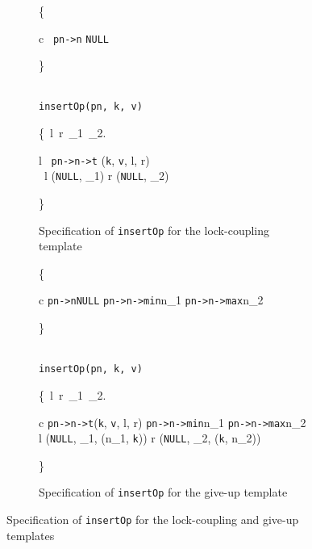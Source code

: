 \documentclass[sigplan,screen]{acmart}
\begin{document}
\begin{figure*}[h]
	\begin{subfigure}{\textwidth}
		\centering
		\begin{mathpar}
			{\color{specblue}
				\left\{ 
				\begin{array}{c}
					\ \texttt{pn->n} \mapsto \texttt{NULL}  
				\end{array}
				\right\}
			} \vspace{-0.85em} 
			\\ 
			\texttt{insertOp(pn, k, v)} 
			\vspace{-0.85em} 
			\\
			{\color{specblue}
				\left\{\exists \  l\ r\ \mathit{lk}_1\ _2.
				\begin{array}{l}
					\ \texttt{pn->n->t} \mapsto (\texttt{k}, \texttt{v}, l, r) \ \ast \ \\ 
					\ l \mapsto (\texttt{NULL}, _1)  \ast  r \mapsto (\texttt{NULL}, \mathit{lk}_2)
				\end{array}
				\right\}
			}
		\end{mathpar}
		\caption{Specification of \texttt{insertOp} for the lock-coupling template}
		\label{fig:insertOp_lock}
	\end{subfigure}
	\begin{subfigure}{\textwidth}
		\begin{mathpar}
			{\color{specblue}
				\left\{ 
				\begin{array}{c}
					\texttt{pn->n}\mapsto \texttt{NULL}  \ast  \texttt{pn->n->min}\mapsto n_1  \ast  \texttt{pn->n->max}\mapsto n_2
				\end{array}
				\right\}
			} \vspace{-0.85em} 
			\\
			\texttt{insertOp(pn, k, v)}
			\vspace{-0.85em} 
			\\
			{\color{specblue}
				\left\{\exists \ l\ r\ _1\ _2. 
				\begin{array}{c}
					\texttt{pn->n->t}\mapsto (\texttt{k}, \texttt{v}, l, r)  \ast  \texttt{pn->n->min}\mapsto n_1 \ast  \texttt{pn->n->max}\mapsto n_2  \ \ast 
					\\ l \mapsto (\texttt{NULL}, _1, (n_1, \texttt{k})) \ast  r \mapsto (\texttt{NULL}, _2, (\texttt{k}, n_2))
				\end{array}
				\right\}
			}
		\end{mathpar}
		\caption{Specification of \texttt{insertOp} for the give-up template}
		\label{fig:insertOp_giveup}
	\end{subfigure}
	\caption{Specification of \texttt{insertOp} for the lock-coupling and give-up templates}
	\label{fig:insertOp}
\end{figure*}
\end{document}
